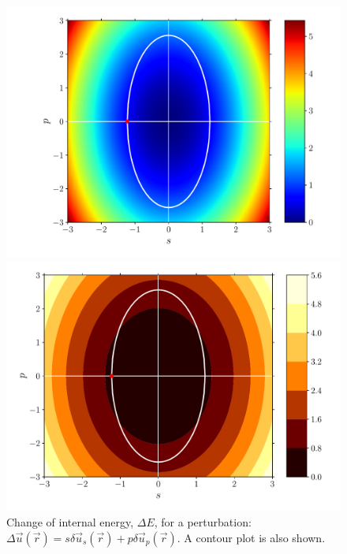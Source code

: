 \documentclass[fleqn]{goose-article}
\begin{document}
\begin{figure}[htp]
    \centering
    \begin{minipage}[t]{.49\textwidth}
        \centering
        \includegraphics[width=\textwidth]{perturbation_phase-diagram_energy.pdf}
    \end{minipage}
    \hfill
    \begin{minipage}[t]{.49\textwidth}
        \centering
        \includegraphics[width=\textwidth]{perturbation_phase-diagram_energy-contour.pdf}
    \end{minipage}
    \caption{
        Change of internal energy, $\Delta E$, for a perturbation:
        $\Delta \vec{u}(\vec{r}) = s \delta \vec{u}_s (\vec{r}) + p \delta \vec{u}_p (\vec{r})$.
        A contour plot is also shown.
    }
    \label{fig:energy}
\end{figure}
\end{document}
